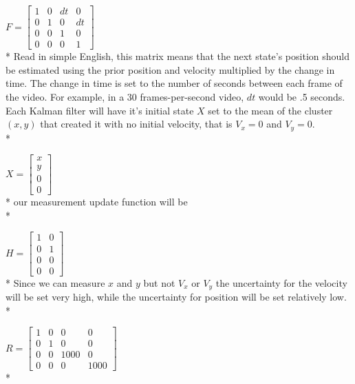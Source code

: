 \documentclass{article} %
\begin{document}
{\centering
$F = \begin{bmatrix}
1 & 0 & dt & 0\\
0 & 1 & 0 & dt\\
0 & 0 & 1 & 0\\
0 & 0 & 0 & 1\end{bmatrix}$\linebreak\newline\\*}
Read in simple English, this matrix means that the next state's position should be estimated using the prior position and velocity multiplied by the change in time. The change in time is set to the number of seconds between each frame of the video. For example, in a 30 frames-per-second video, $dt$ would be .5 seconds.
Each Kalman filter will have it's initial state $X$ set to the mean of the cluster $(x,y)$ that created it with no initial velocity, that is $V_x = 0$ and $V_y = 0$. \\*

{\centering
$X = \begin{bmatrix}
x \\
y \\
0 \\
0 \end{bmatrix}$\linebreak\newline\\*}
our measurement update function will be\\*

{\centering
$H = \begin{bmatrix}
1 & 0 \\
0 & 1 \\
0 & 0 \\
0 & 0 \end{bmatrix}$\linebreak\newline\\*}
Since we can measure $x$ and $y$ but not $V_x$ or $V_y$ the uncertainty for the velocity will be set very high, while the uncertainty for position will be set relatively low.\\*

{\centering
$R = \begin{bmatrix}
 1 & 0 & 0 & 0\\
 0 & 1 & 0 & 0\\
 0 & 0 & 1000 & 0\\
 0 & 0 & 0 & 1000\end{bmatrix}$\linebreak\newline\\*}
\end{document}

